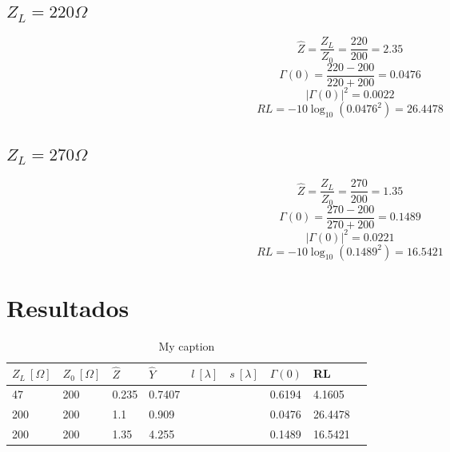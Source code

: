 \documentclass[12pt,letterpaper]{article}
\begin{document}
\subsection{$Z_L=220 \Omega$}
\begin{equation}
    \hat{Z}=\frac{Z_L}{Z_0}=\frac{220}{200}=2.35
\end{equation}
\begin{equation}
    \Gamma(0)=\frac{220-200}{220+200}=0.0476
\end{equation}
\begin{equation}
    |\Gamma(0)|^{2}=0.0022
\end{equation}
\begin{equation}
    RL=-10\log_{10} (0.0476^{2})=26.4478
\end{equation}

\subsection{$Z_L=270 \Omega$}
\begin{equation}
    \hat{Z}=\frac{Z_L}{Z_0}=\frac{270}{200}=1.35
\end{equation}
\begin{equation}
    \Gamma(0)=\frac{270-200}{270+200}=0.1489
\end{equation}
\begin{equation}
    |\Gamma(0)|^{2}=0.0221
\end{equation}
\begin{equation}
    RL=-10\log_{10} (0.1489^{2})=16.5421
\end{equation}

\section{Resultados}
\begin{table}[ht]
    \centering
    \begin{tabular}{|l|l|l|l|l|l|l|l|l|}
    \hline
    $Z_L \ [\Omega] $ & $Z_0 \ [\Omega] $ & $\hat{Z}$ & $\hat{Y}$ & $l \ [\lambda] $ & $s \ [\lambda] $ & $\Gamma(0)$ & RL &  \\ \hline
    47 & 200 & 0.235 & 0.7407 & & & 0.6194 & 4.1605 &    \\ \hline
    200 & 200 & 1.1 & 0.909 & & & 0.0476 & 26.4478 &    \\ \hline
    200 & 200 & 1.35 & 4.255 & & & 0.1489 & 16.5421 &    \\ \hline
    \end{tabular}
    \caption{My caption}
    \label{my-label}
\end{table}
\end{document}
